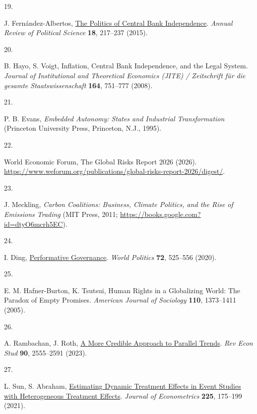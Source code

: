 \documentclass[
  12pt,
  letterpaper,
]{article}
\newlength{\cslhangindent}
\newlength{\csllabelwidth}
\newenvironment{CSLReferences}[2] %
 {\begin{list}{}{%
  \setlength{\itemindent}{0pt}
  \setlength{\leftmargin}{0pt}
  \setlength{\parsep}{0pt}
  \ifodd #1
   \setlength{\leftmargin}{\cslhangindent}
   \setlength{\itemindent}{-1\cslhangindent}
  \fi
  \setlength{\itemsep}{#2\baselineskip}}}
 {\end{list}}
\newcommand{\CSLLeftMargin}[1]{\parbox[t]{\csllabelwidth}{\strut#1\strut}}
\newcommand{\CSLRightInline}[1]{\parbox[t]{\linewidth - \csllabelwidth}{\strut#1\strut}}
\begin{document}
\begin{CSLReferences}{0}{1}
\CSLLeftMargin{19. }%
\CSLRightInline{J. Fernández-Albertos,
\href{https://doi.org/10.1146/annurev-polisci-071112-221121}{The
{Politics} of {Central Bank Independence}}. \emph{Annual Review of
Political Science} \textbf{18}, 217--237 (2015).}

\CSLLeftMargin{20. }%
\CSLRightInline{B. Hayo, S. Voigt, Inflation, {Central Bank
Independence}, and the {Legal System}. \emph{Journal of Institutional
and Theoretical Economics (JITE) / Zeitschrift für die gesamte
Staatswissenschaft} \textbf{164}, 751--777 (2008).}

\CSLLeftMargin{21. }%
\CSLRightInline{P. B. Evans, \emph{Embedded {Autonomy}: {States} and
{Industrial Transformation}} (Princeton University Press, Princeton,
N.J., 1995).}

\CSLLeftMargin{22. }%
\CSLRightInline{World Economic Forum, The {Global Risks Report} 2026
(2026).
\url{https://www.weforum.org/publications/global-risks-report-2026/digest/}.}

\CSLLeftMargin{23. }%
\CSLRightInline{J. Meckling, \emph{Carbon {Coalitions}: {Business},
{Climate Politics}, and the {Rise} of {Emissions Trading}} (MIT Press,
2011; \url{https://books.google.com?id=dtyO6mcrh5EC}).}

\CSLLeftMargin{24. }%
\CSLRightInline{I. Ding,
\href{https://doi.org/10.1017/S0043887120000131}{Performative
{Governance}}. \emph{World Politics} \textbf{72}, 525--556 (2020).}

\CSLLeftMargin{25. }%
\CSLRightInline{E. M. Hafner-Burton, K. Tsutsui, Human {Rights} in a
{Globalizing World}: {The Paradox} of {Empty Promises}. \emph{American
Journal of Sociology} \textbf{110}, 1373--1411 (2005).}

\CSLLeftMargin{26. }%
\CSLRightInline{A. Rambachan, J. Roth,
\href{https://doi.org/10.1093/restud/rdad018}{A {More Credible Approach}
to {Parallel Trends}}. \emph{Rev Econ Stud} \textbf{90}, 2555--2591
(2023).}

\CSLLeftMargin{27. }%
\CSLRightInline{L. Sun, S. Abraham,
\href{https://doi.org/10.1016/j.jeconom.2020.09.006}{Estimating {Dynamic
Treatment Effects} in {Event Studies} with {Heterogeneous Treatment
Effects}}. \emph{Journal of Econometrics} \textbf{225}, 175--199
(2021).}

\end{CSLReferences}
\end{document}
